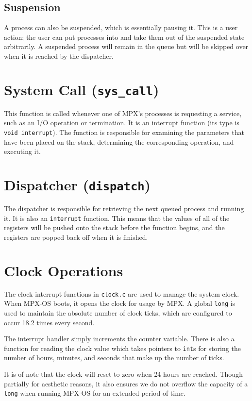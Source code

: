 \subsection{Suspension}

A process can also be suspended, which is essentially pausing it. This is a user action; the user can put processes into and take them out of the suspended state arbitrarily. A suspended process will remain in the queue but will be skipped over when it is reached by the dispatcher.

\section{System Call ({\tt sys\_call})}

This function is called whenever one of MPX's processes is requesting a service, such as an I/O operation or termination. It is an interrupt function (its type is {\tt void interrupt}). The function is responsible for examining the parameters that have been placed on the stack, determining the corresponding operation, and executing it.

\section{Dispatcher ({\tt dispatch})}

The dispatcher is responsible for retrieving the next queued process and running it. It is also an {\tt interrupt} function. This means that the values of all of the registers will be pushed onto the stack before the function begins, and the registers are popped back off when it is finished.

\section{Clock Operations}

The clock interrupt functions in {\tt clock.c} are used to manage the system clock. When MPX-OS boots, it opens the clock for usage by MPX. A global {\tt long} is used to maintain the absolute number of clock ticks, which are configured to occur 18.2 times every second.

The interrupt handler simply increments the counter variable. There is also a function for reading the clock value which takes pointers to {\tt int}s for storing the number of hours, minutes, and seconds that make up the number of ticks.

It is of note that the clock will reset to zero when 24 hours are reached. Though partially for aesthetic reasons, it also ensures we do not overflow the capacity of a {\tt long} when running MPX-OS for an extended period of time.

